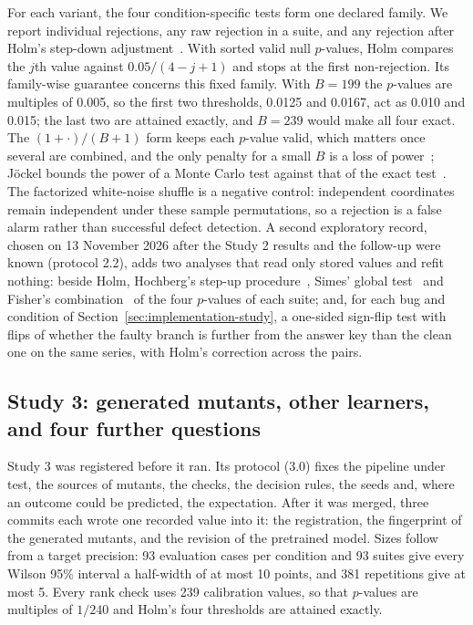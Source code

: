 \documentclass[11pt,a4paper]{article}
\begin{document}
For each variant, the four condition-specific tests form one declared
family. We report individual rejections, any raw rejection in a suite,
and any rejection after Holm's step-down adjustment~\cite{holm1979multiple}.
With sorted valid null $p$-values, Holm compares the $j$th value against
$0.05/(4-j+1)$ and stops at the first non-rejection. Its family-wise
guarantee concerns this fixed family.
With $B=199$ the $p$-values are multiples of 0.005, so the first two
thresholds, 0.0125 and 0.0167, act as 0.010 and 0.015; the last two are
attained exactly, and $B=239$ would make all four exact. The
$(1+\cdot)/(B+1)$ form keeps each $p$-value valid, which matters once
several are combined, and the only penalty for a small $B$ is a loss of
power~\cite{phipson2010permutation}; J\"ockel bounds the power of a Monte
Carlo test against that of the exact test~\cite{jockel1986finite}.
The factorized white-noise shuffle is a negative control: independent
coordinates remain independent under these sample permutations, so a
rejection is a false alarm rather than successful defect detection.
A second exploratory record, chosen on 13 November 2026 after the Study 2
results and the follow-up were known (protocol 2.2), adds two analyses
that read only stored values and refit nothing: beside Holm, Hochberg's step-up
procedure~\cite{hochberg1988sharper}, Simes' global
test~\cite{simes1986improved} and Fisher's
combination~\cite{fisher1932statistical} of the four $p$-values of each
suite; and, for each bug and condition of
Section~\ref{sec:implementation-study}, a one-sided sign-flip test with
\PairedFlips{} flips of whether the faulty branch is further from the answer key
than the clean one on the same series, with Holm's correction across the
pairs.

\subsection{Study 3: generated mutants, other learners, and four further questions}
\label{sec:third-study}

Study 3 was registered before it ran. Its protocol (3.0) fixes the
pipeline under test, the sources of mutants, the checks, the decision
rules, the seeds and, where an outcome could be predicted, the
expectation. After it was merged, three commits each wrote one recorded
value into it: the registration, the fingerprint of the generated
mutants, and the revision of the pretrained model. Sizes follow from a
target precision: 93 evaluation cases per condition and 93 suites give
every Wilson 95\% interval a half-width of at most 10 points, and 381
repetitions give at most 5. Every rank check uses 239 calibration values,
so that $p$-values are multiples of $1/240$ and Holm's four thresholds are
attained exactly.
\end{document}
